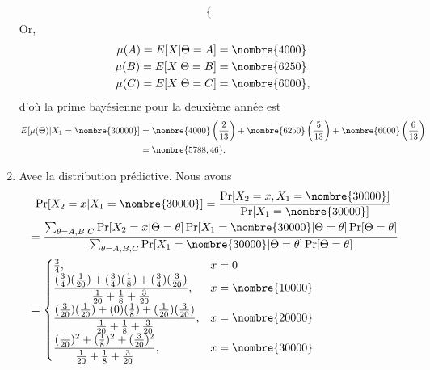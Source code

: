 \begin{exercice}
\begin{sol}
\begin{enumerate}[1.]
\begin{align*}
\begin{cases}
        \end{cases}
      \end{align*}
      Or,
      \begin{align*}
        \mu(A) = \esp{X|\Theta = A} &= \nombre{4000} \\
        \mu(B) = \esp{X|\Theta = B} &= \nombre{6250} \\
        \mu(C) = \esp{X|\Theta = C} &= \nombre{6000},
      \end{align*}
      d'où la prime bayésienne pour la deuxième année est
      \begin{align*}
        \esp{\mu(\Theta)|X_1 = \nombre{30000}}
        &= \nombre{4000} \left( \frac{2}{13} \right)
        + \nombre{6250} \left( \frac{5}{13} \right)
        + \nombre{6000} \left( \frac{6}{13} \right) \\
        &=\nombre{5788,46}.
      \end{align*}
    \item Avec la distribution prédictive. Nous avons
      \begin{multline*}
        \Pr[X_2 = x|X_1 = \nombre{30000}]
        = \frac{\Pr[X_2 = x, X_1 = \nombre{30000}]}{\Pr[X_1 =
          \nombre{30000}]} \\
        \begin{split}
          &= \frac{\sum_{\theta=A,B,C} \Pr[X_2 = x|\Theta = \theta]
            \Pr[X_1 = \nombre{30000}|\Theta = \theta]\Pr[\Theta =
            \theta]}%
          {\sum_{\theta=A,B,C} \Pr[X_1 = \nombre{30000}|\Theta =
            \theta]\Pr[\Theta = \theta]} \\
          &=
          \begin{cases}
            \frac{3}{4},
            & x = 0 \\
            \dfrac{(\frac{3}{4}) (\frac{1}{20}) +
              (\frac{3}{4}) (\frac{1}{8}) +
              (\frac{3}{4}) (\frac{3}{20})}{%
              \frac{1}{20} + \frac{1}{8} + \frac{3}{20}},
            & x = \nombre{10000} \\
            \dfrac{(\frac{3}{20}) (\frac{1}{20}) +
              (0) (\frac{1}{8}) +
              (\frac{1}{20}) (\frac{3}{20})}{%
              \frac{1}{20} + \frac{1}{8} + \frac{3}{20}},
            & x = \nombre{20000} \\
            \dfrac{(\frac{1}{20})^2 +
              (\frac{1}{8})^2 +
              (\frac{3}{20})^2}{%
              \frac{1}{20} + \frac{1}{8} + \frac{3}{20}},
            & x = \nombre{30000}
          \end{cases} \\

\end{split}
\end{multline*}
\end{enumerate}
\end{sol}
\end{exercice}
